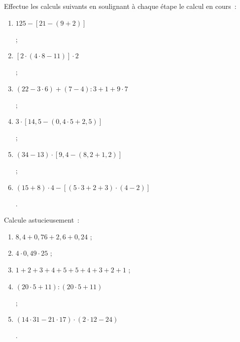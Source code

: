 \begin{exercice}
Effectue les calculs suivants en soulignant à chaque étape le calcul en cours :
\begin{enumerate}
 \item $125 - [21 - (9 + 2)]$ \dotfill	
 
 \dotfill		
 
 \dotfill ;
	
 \item $[2 \cdot (4 \cdot 8 - 11)] \cdot 2$ \dotfill	

 \dotfill	

 \dotfill ;
	
 \item $(22 - 3 \cdot 6) + (7 - 4) : 3 + 1 + 9 \cdot 7$ \dotfill          	

 \dotfill	

 \dotfill	
 
 \dotfill ;
	
 \item $3 \cdot [14,5 - (0,4 \cdot 5 + 2,5)]$ \dotfill
	
 \dotfill		

 \dotfill

 \dotfill ;
	
 \item $(34 - 13) \cdot [9,4 - (8,2 + 1,2)]$ \dotfill	

 \dotfill

 \dotfill

 \dotfill ;
	
 \item $(15 + 8) \cdot 4 - [(5 \cdot 3 + 2 + 3) \cdot (4 - 2)]$ \dotfill
 
 \dotfill	

 \dotfill
 
 \dotfill.
 \end{enumerate}
\end{exercice}


\begin{exercice}
Calcule astucieusement :
\begin{enumerate}
 \item $8,4 + 0,76 + 2,6 + 0,24$ \dotfill ;
 \item $4 \cdot 0,49 \cdot 25$ \dotfill ;
 \item $1 + 2 + 3 + 4 + 5 + 5 + 4 + 3 + 2 + 1$ \dotfill ;
 \item $(20 \cdot 5 + 11) : (20 \cdot 5 + 11)$ \dotfill
 
 \dotfill ;
 
 \item $(14 \cdot  31 - 21 \cdot  17) \cdot  (2 \cdot  12 - 24)$ \dotfill
 
 \dotfill.
 \end{enumerate}
\end{exercice}


